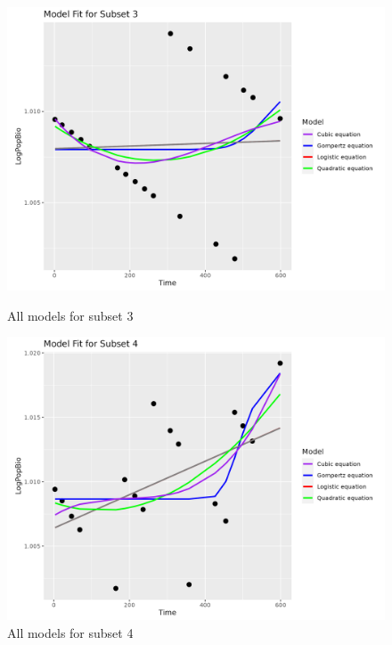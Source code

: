\documentclass[11pt]{article}
\begin{document}
\begin{figure}[htbp]
    \centering
    \begin{minipage}{0.48\textwidth}
        \includegraphics[width=\linewidth]{../results/plot/subset_3_plot.png}
        \caption{All models for subset 3}
        \label{fig:figure1}
    \end{minipage}\hfill
    \begin{minipage}{0.48\textwidth}
        \includegraphics[width=\linewidth]{../results/plot/subset_4_plot.png}
        \caption{All models for subset 4}
        \label{fig:figure2}
    \end{minipage}
\end{figure}
\end{document}

